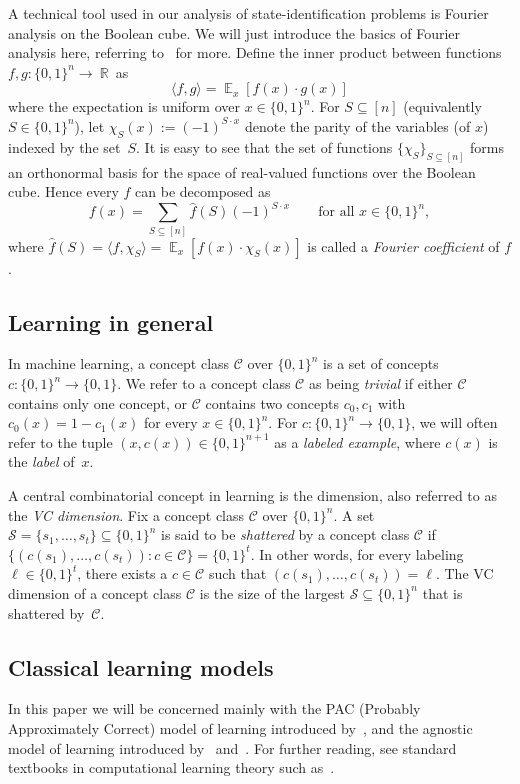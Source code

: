 \documentclass[twoside,11pt]{article}
\newcommand{\Sh}{\ensuremath{\mathcal{S}}}
\newcommand{\R}{\ensuremath{\mathbb{R}}}
\DeclareMathOperator*{\Ex}{\mathbb{E}}
\def\01{\{0,1\}}
\newcommand{\C}{\ensuremath{\mathscr{C}}}
\begin{document}
A technical tool used in our analysis of state-identification problems is Fourier analysis on the Boolean cube. We will just introduce the basics of Fourier analysis here, referring to~\cite{odonnell:analysis} for more. Define the inner product between functions $f,g:\01^n\rightarrow~\R$~as
$$
\langle f,g\rangle=\Ex_x [f(x)\cdot g(x)]
$$
where the expectation is uniform over $x\in \01^n$. For $S\subseteq [n]$ (equivalently $S\in\01^n$), let $\chi_S(x):=(-1)^{S\cdot x}$ denote the parity of the variables (of $x$) indexed by the set~$S$. It is easy to see that the set of functions $\{\chi_S\}_{S\subseteq [n]}$ forms an orthonormal basis for the space of real-valued functions over the Boolean cube. Hence every $f$ can be decomposed as 
$$
f(x)=\sum_{S\subseteq [n]} \widehat{f}(S) (-1)^{S\cdot x} \qquad \text{for all }x\in \01^n,
$$ 
where $\widehat{f}(S)=\langle f,\chi_S\rangle=\Ex_x [f(x)\cdot \chi_S(x)]$ is called a \emph{Fourier coefficient} of $f$.

\subsection{Learning in general}

In machine learning, a concept class $\C$ over $\01^n$ is a set of concepts $c:\01^n\rightarrow \01$.  We refer to a concept class $\C$ as being \emph{trivial} if either $\C$ contains only one concept, or $\C$ contains two concepts $c_0, c_1$ with $c_0(x)=1-c_1(x)$ for every $x\in \01^n$. For $c:\01^n\rightarrow \01$, we will often refer to the tuple $(x,c(x))\in \01^{n+1}$ as a \emph{labeled example}, where $c(x)$ is the \emph{label} of~$x$.

A central combinatorial concept in learning is the \cite{vapnik:vcdimension} dimension, also referred to as the \emph{VC dimension}. Fix a concept class $\C$ over $\01^n$. A set $\Sh=\{s_1,\ldots,s_t\}\subseteq \01^n$ is said to be \emph{shattered} by a concept class $\C$ if  $\{(c({s_1}),\ldots,c({s_t})) : c\in \C\} =\01^{t}$. In other words, for every labeling $\ell\in \01^{t}$, there exists a $c\in \C$ such that $(c({s_1}),\ldots,c({s_t}))=\ell$. The VC dimension of a concept class $\C$ is the  size of the largest $\Sh\subseteq \01^n$ that is shattered by~$\C$.



\subsection{Classical learning models}
\label{section:classicallearningmodels}
In this paper we will be concerned mainly with the PAC (Probably Approximately Correct) model of learning introduced by~\cite{valiant:paclearning}, and the agnostic model of learning introduced by~\cite{haussler:agnosticlearning} and~\cite{kearns:agnosticlearning}. For further reading, see standard textbooks in computational learning theory such as~\cite{kearnss&vazirani:learningbook,anthony&bartlett:learningbook,shwartz&david:learningbook}.
\end{document}
